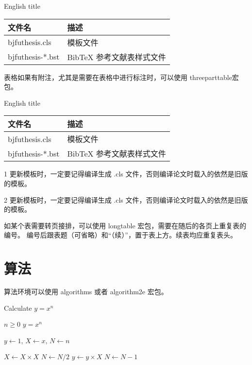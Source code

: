 \begin{table}[h]
	\xiaowu

	\centering
	 {English title}
	\begin{tabular}{ll}
		\toprule
		文件名           & 描述                      \\
		\midrule
		bjfuthesis.cls   & 模板文件                  \\
		bjfuthesis-*.bst & BibTeX 参考文献表样式文件 \\
		\bottomrule
	\end{tabular}
	\label{tab:three-line}
\end{table}

表格如果有附注，尤其是需要在表格中进行标注时，可以使用 threeparttable宏包。

\begin{table}[h]
	\xiaowu
	\centering
	\begin{threeparttable}[c]
		 {English title}
		\label{tab:three-part-table}
		\begin{tabular}{ll}
			\toprule
			文件名                     & 描述                      \\
			\midrule
			bjfuthesis.cls\tnote{1}    & 模板文件                  \\
			bjfuthesis-*.bst \tnote{2} & BibTeX 参考文献表样式文件 \\
			\bottomrule
		\end{tabular}
		\begin{tablenotes}

			\item [1] 更新模板时，一定要记得编译生成 .cls 文件，否则编译论文时载入的依然是旧版的模板。
			\item [2] 更新模板时，一定要记得编译生成 .cls 文件，否则编译论文时载入的依然是旧版的模板。
		\end{tablenotes}
	\end{threeparttable}
\end{table}

如某个表需要转页接排，可以使用 longtable 宏包，需要在随后的各页上重复表的编号。
编号后跟表题（可省略）和“（续）”，置于表上方。续表均应重复表头。


\section{算法}

算法环境可以使用 algorithms 或者 algorithm2e 宏包。
\renewcommand{\algorithmicrequire}{\textbf{输入：}\unskip}
\renewcommand{\algorithmicensure}{\textbf{输出：}\unskip}

\begin{algorithm}[ht]
	\caption{Calculate $y = x^n$}
	\label{alg1}
	\small
	\begin{algorithmic}
		\REQUIRE $n \geq 0$
		\ENSURE $y = x^n$

		\STATE $y \leftarrow 1$, $X \leftarrow x$, $N \leftarrow n$

		\STATE $X \leftarrow X \times X$
		\STATE $N \leftarrow N / 2$
		\ELSE[$N$ is odd]
		\STATE $y \leftarrow y \times X$
		\STATE $N \leftarrow N - 1$
		\ENDIF
		\ENDWHILE
	\end{algorithmic}
\end{algorithm}
